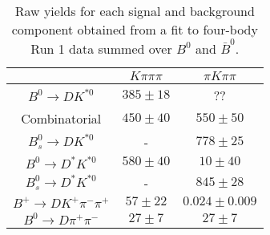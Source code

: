 \begin{table}
  \centering
  \begin{tabular}{ccc}
      \toprule
       & $K\pi\pi\pi$ & $\pi K\pi\pi$ \\
      \midrule
      $B^0 \to DK^{*0}$ & $385 \pm 18$ & ?? \\
      Combinatorial & $450 \pm 40$ & $550 \pm 50$ \\
      $B^0_s \to DK^{*0}$ & \-- & $778 \pm 25$ \\
      $B^0 \to D^*K^{*0}$ & $580 \pm 40$ & $10 \pm 40$ \\
      $B^0_s \to D^*K^{*0}$ & \-- & $845 \pm 28$ \\
      $B^+ \to DK^+\pi^-\pi^+$ & $57 \pm 22$ & $0.024 \pm 0.009$ \\
      $B^0 \to D\pi^+\pi^-$ & $27 \pm 7$ & $27 \pm 7$ \\
      \bottomrule
      \end{tabular}
  \caption{Raw yields for each signal and background component obtained from a fit to four-body Run 1 data summed over $B^0$ and $\bar{B}^0$.}
\label{tab:yields_combined_4body_run1}
\end{table}
